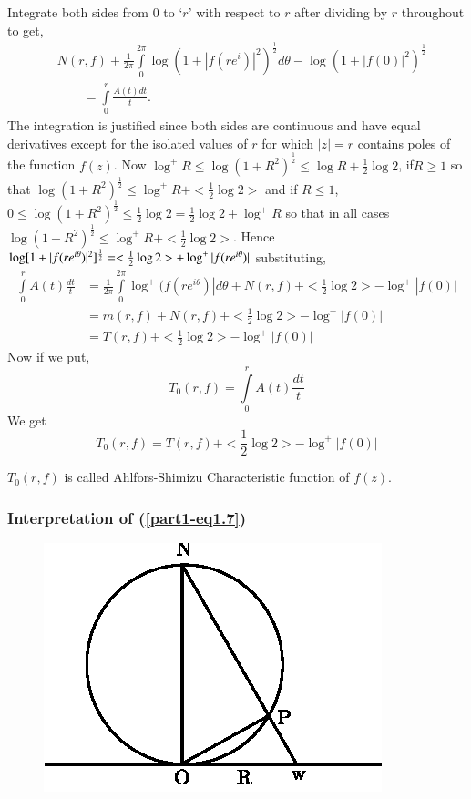 Integrate both sides from $0$ to `$r$' with respect to $r$ after
dividing by $r$ throughout to get,
\begin{align*}
& N(r,f)+\frac{1}{2\pi}\int\limits^{2\pi}_{0}\log(1+|f(re^{i})|^{2})^{\frac{1}{2}}d\theta-\log(1+|f(0)|^{2})^{\frac{1}{2}}\\
&\qquad =\int\limits^{r}_{0}\frac{A(t)dt}{t}.\tag{1.7}\label{part1-eq1.7}
\end{align*}
The integration is justified since both sides are continuous and have
equal derivatives except for the isolated values of $r$ for which
$|z|=r$ contains poles of the function $f(z)$. Now $\log^{+}R\leq
\log(1+R^{2})^{\frac{1}{2}}\leq \log R+\frac{1}{2}\log 2$,
if\pageoriginale $R\geq 1$ so that $\log(1+R^{2})^{\frac{1}{2}}\leq
\log^{+}R+<\frac{1}{2}\log 2>$ and if $R\leq 1$, $0\leq
\log(1+R^{2})^{\frac{1}{2}}\leq \frac{1}{2}\log 2=\frac{1}{2}\log
2+\log^{+}R$ so that in all cases $\log(1+R^{2})^{\frac{1}{2}}\leq
\log^{+}R+<\frac{1}{2}\log 2>$. Hence
$\log[1+|f(re^{i\theta})|^{2}]^{\frac{1}{2}}=\break <\frac{1}{2}\log
2>+\log^{+}|f(re^{i\theta})|$ substituting,
\begin{align*}
\int\limits^{r}_{0}A(t)\frac{dt}{t} &=
\frac{1}{2\pi} \int\limits^{2\pi}_{0} \log^{+}(f(re^{i\theta})|
d\theta+N(r,f)+<\frac{1}{2}\log 2>-\log^{+}|f(0)|\\
&= m(r,f)+N(r,f)+<\frac{1}{2}\log 2>-\log^{+}|f(0)|\\
&= T(r,f)+<\frac{1}{2}\log 2>-\log^{+}|f(0)|
\end{align*}
Now if we put,
$$
T_{0}(r,f)=\int\limits^{r}_{0}A(t)\frac{dt}{t}
$$
We get
$$
T_{0}(r,f)=T(r,f)+<\frac{1}{2}\log 2>-\log^{+}|f(0)|
$$

\begin{defi*}
$T_{0}(r,f)$ is called Ahlfors-Shimizu Characteristic function of $f(z)$.
\end{defi*}

\subsubsection{Interpretation of
  (\ref{part1-eq1.7})}\label{part1-subsubsec1.6.1} 
\begin{figure}[H]
\centering
\includegraphics{hayman_fig2.eps}
\end{figure}

